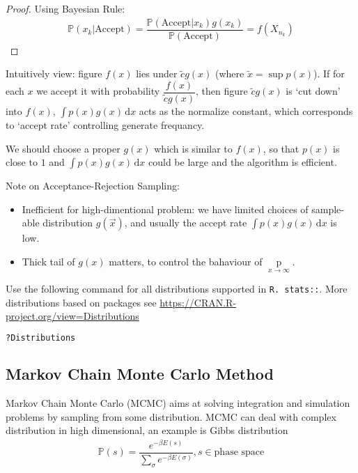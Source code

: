 \begin{itemize}[topsep=2pt,itemsep=0pt]
\begin{proof}
    Using Bayesian Rule:
    \begin{align}
        \mathbb{P}(x_k|\mathrm{Accept} )=\dfrac{\mathbb{P}(\mathrm{Accept}|x_k )g(x_k)}{\mathbb{P}(\mathrm{Accept} )}=f(X_{n_k}) 
    \end{align}
    \end{proof}

    Intuitively view: figure $ f(x) $ lies under $ \tilde{c}g(x) $ (where $ \tilde{x}=\sup p(x) $). If for each $ x $ we accept it with probability $ \dfrac{f(x)}{\tilde{c}g(x)} $, then figure $ \tilde{c}g(x) $ is `cut down' into $ f(x) $, $ \int p(x)g(x) \,\mathrm{d}x $ acts as the normalize constant, which corresponds to `accept rate' controlling generate frequancy.

    We should choose a proper $ g(x) $ which is similar to $ f(x) $, so that $ p(x) $ is close to $ 1 $ and $ \int p(x)g(x) \,\mathrm{d}x $ could be large and the algorithm is efficient.    
    
    Note on Acceptance-Rejection Sampling:
    \begin{itemize}[topsep=2pt,itemsep=0pt]
        \item Inefficient for high-dimentional problem: we have limited choices of sample-able distribution $ g(\vec{x}) $, and usually the accept rate $  \int p(x)g(x) \,\mathrm{d}x $ is low.
        \item Thick tail of $ g(x) $ matters, to control the bahaviour of $ \mathop{  p(x) }\limits_{x\to\infty} $.
    \end{itemize}
    
        
\end{itemize}

\begin{rcode}
    Use the following command for all distributions supported in \lstinline|R. stats::|. More distributions based on packages see \url{https://CRAN.R-project.org/view=Distributions}
\begin{lstlisting}[language=R]
?Distributions
\end{lstlisting}
\end{rcode}



\subsection{Markov Chain Monte Carlo Method}\label{SubSubSectionMCMCAlgorithm}
Markov Chain Monte Carlo (MCMC) aims at solving integration and simulation problems by sampling from some distribution. MCMC can deal with complex distribution in high dimensional, an example is Gibbs distribution
\begin{align}
    \mathbb{P}\left( s \right) =\dfrac{e^{-\beta E(s)}}{\sum_{\sigma }e^{-\beta E(\sigma )}}, s\in\text{phase space} 
\end{align}

